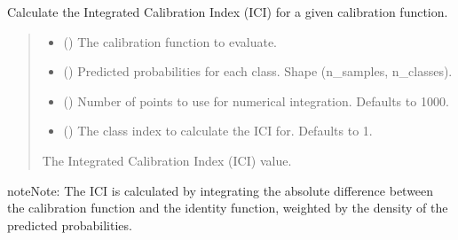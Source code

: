 \documentclass[letterpaper,10pt,english]{sphinxmanual}
\begin{document}
\begin{fulllineitems}
\label{\detokenize{calzone:calzone.metrics.cal_ICI}}
\pysigstartsignatures
{}
\pysigstopsignatures
\sphinxAtStartPar
Calculate the Integrated Calibration Index (ICI) for a given calibration function.
\begin{quote}\begin{description}
\begin{itemize}
\item {} 
\sphinxAtStartPar
{} () \textendash{} The calibration function to evaluate.

\item {} 
\sphinxAtStartPar
{} () \textendash{} Predicted probabilities for each class. Shape (n\_samples, n\_classes).

\item {} 
\sphinxAtStartPar
{} (\sphinxstyleliteralemphasis{\sphinxupquote{, }}) \textendash{} Number of points to use for numerical integration. Defaults to 1000.

\item {} 
\sphinxAtStartPar
{} (\sphinxstyleliteralemphasis{\sphinxupquote{, }}) \textendash{} The class index to calculate the ICI for. Defaults to 1.

\end{itemize}

\sphinxAtStartPar
{} \textendash{} The Integrated Calibration Index (ICI) value.

\end{description}\end{quote}

\begin{sphinxadmonition}{note}{Note:}
\sphinxAtStartPar
The ICI is calculated by integrating the absolute difference between
the calibration function and the identity function, weighted by the
density of the predicted probabilities.
\end{sphinxadmonition}

\end{fulllineitems}
\end{document}
